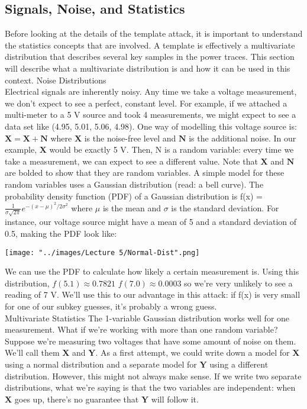 \documentclass{report}
\begin{document}
    \subsection{Signals, Noise, and Statistics}
    Before looking at the details of the template attack, it is important to understand the statistics concepts that are involved. A template is effectively a multivariate distribution that describes several key samples in the power traces. This section will describe what a multivariate distribution is and how it can be used in this context.
    Noise Distributions\\
    Electrical signals are inherently noisy. Any time we take a voltage measurement, we don't expect to see a perfect, constant level. For example, if we attached a multi-meter to a 5 V source and took 4 measurements, we might expect to see a data set like (4.95, 5.01, 5.06, 4.98). One way of modelling this voltage source is: 
    $\mathbf{X} = \mathbf{X} + \mathbf{N}$
    where $\mathbf{X}$
    is the noise-free level and $\mathbf{N}$ is the additional noise. In our example, $\mathbf{X}$ would be exactly 5 V. Then, N is a random variable: every time we take a measurement, we can expect to see a different value. Note that $\mathbf{X}$ and $\mathbf{N}$ are bolded to show that they are random variables.
    A simple model for these random variables uses a Gaussian distribution (read: a bell curve). The probability density function (PDF) of a Gaussian distribution is
    f(x) = $ \frac{1}{\sigma \sqrt{2\pi}} e^{-(x - \mu)^2 / 2\sigma^2}$
    where $\displaystyle \mu$  is the mean and  $ \sigma$ is the standard deviation. For instance, our voltage source might have a mean of 5 and a standard deviation of 0.5, making the PDF look like:\\
    \begin{minipage}{\linewidth}
    \centering
    \texttt{[image: "../images/Lecture 5/Normal-Dist".png]}
    \end{minipage}
    We can use the PDF to calculate how likely a certain measurement is. Using this distribution,
    $f(5.1) \approx 0.7821$
    $f(7.0) \approx 0.0003$
    so we're very unlikely to see a reading of 7 V. We'll use this to our advantage in this attack: if f(x) is very small for one of our subkey guesses, it's probably a wrong guess.\\
    Multivariate Statistics
    The 1-variable Gaussian distribution works well for one measurement. What if we're working with more than one random variable?
    Suppose we're measuring two voltages that have some amount of noise on them. We'll call them $\mathbf{X}$ and $\mathbf{Y}$. As a first attempt, we could write down a model for $\mathbf{X}$ using a normal distribution and a separate model for $\mathbf{Y}$ using a different distribution. However, this might not always make sense. If we write two separate distributions, what we're saying is that the two variables are independent: when $\mathbf{X}$ goes up, there's no guarantee that $\mathbf{Y}$ will follow it.
\end{document}
